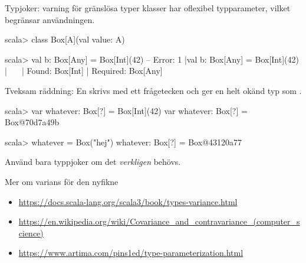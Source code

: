 \begin{Slide}{Typjoker: varning för gränslösa typer}\SlideFontSmall
{} klasser har oflexibel typparameter, vilket begränsar användningen. %
\begin{REPL}
scala> class Box[A](val value: A)

scala> val b: Box[Any] = Box[Int](42)
-- Error:
1 |val b: Box[Any] = Box[Int](42)
  |                  ^^^^^^^^^^^^
  |                  Found:    Box[Int]
  |                  Required: Box[Any]
\end{REPL}  
Tveksam räddning: En   skrivs med ett frågetecken och ger en helt okänd typ  som .
\begin{REPL}
scala> var whatever: Box[?] = Box[Int](42)
var whatever: Box[?] = Box@70d7a49b
                                                                                    
scala> whatever = Box("hej")
whatever: Box[?] = Box@43120a77
\end{REPL}
Använd bara typpjoker om det \emph{verkligen} behövs.
\end{Slide}


\begin{Slide}{Mer om varians för den nyfikne}
\begin{itemize}\SlideFontSmall
  \item \href{https://docs.scala-lang.org/scala3/book/types-variance.html}{https://docs.scala-lang.org/scala3/book/types-variance.html}
  \item \href{https://en.wikipedia.org/wiki/Covariance_and_contravariance_(computer_science)}{https://en.wikipedia.org/wiki/Covariance\_and\_contravariance\_(computer\_science)}
  \item \href{https://www.artima.com/pins1ed/type-parameterization.html}{https://www.artima.com/pins1ed/type-parameterization.html}

\end{itemize}
\end{Slide}


